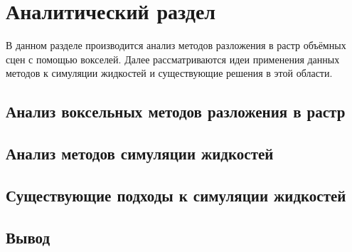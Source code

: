 \chapter{Аналитический раздел}
\label{cha:analysis}
%

В данном разделе производится анализ методов разложения в растр объёмных сцен
с помощью вокселей. Далее рассматриваются идеи применения данных методов к симуляции жидкостей и существующие решения в этой области.

\section{Анализ воксельных методов разложения в растр}


\section{Анализ методов симуляции жидкостей}


\section{Существующие подходы к симуляции жидкостей}

\section{Вывод}



